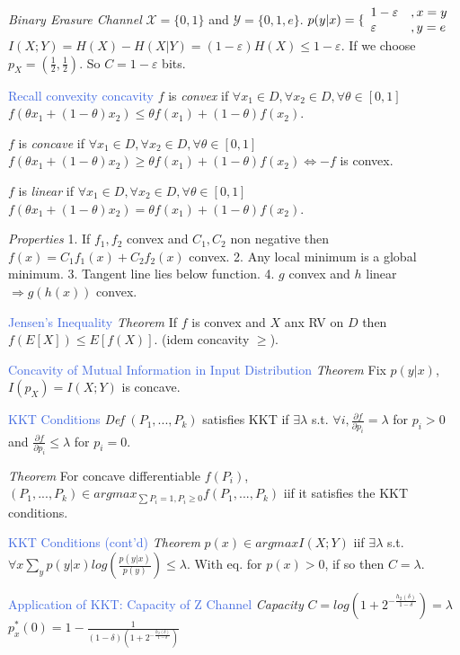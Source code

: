 \documentclass[10pt,a4paper,landscape]{article}
\newcommand{\concept}[1]{\textcolor{RoyalBlue}{#1}}
\newcommand{\subconcept}[1]{\textcolor{PineGreen}{\textit{#1}}}
\begin{document}
\begin{multicols*}{4}
\subconcept{Binary Erasure Channel}
$\mathcal{X}=\{0,1\}$ and $\mathcal{Y}=\{0,1,e\}$.
$p(y|x)=\{
   \begin{array}{l l}
      1-\varepsilon & ,x=y \\
      \varepsilon & ,y=e 
   \end{array}$
$I(X;Y)=H(X)-H(X|Y)=(1-\varepsilon)H(X) \le 1-\varepsilon$.
If we choose $p_X=(\frac{1}{2},\frac{1}{2})$.
So $C=1-\varepsilon$ bits.

\concept{Recall convexity concavity}
$f$ is \subconcept{convex} if $\forall x_1 \in D, \forall x_2 \in D, \forall \theta \in [0,1]$
$f(\theta x_1 + (1-\theta)x_2) \le \theta f(x_1)+ (1-\theta)f(x_2)$.

$f$ is \subconcept{concave} if $\forall x_1 \in D, \forall x_2 \in D, \forall \theta \in [0,1]$
$f(\theta x_1 + (1-\theta)x_2) \ge \theta f(x_1)+ (1-\theta)f(x_2) \Leftrightarrow -f$ is convex.

$f$ is \subconcept{linear} if $\forall x_1 \in D, \forall x_2 \in D, \forall \theta \in [0,1]$
$f(\theta x_1 + (1-\theta)x_2) = \theta f(x_1)+ (1-\theta)f(x_2)$.

\subconcept{Properties}
1. If $f_1,f_2$ convex and $C_1,C_2$ non negative then $f(x)=C_1f_1(x)+C_2f_2(x)$ convex.
2. Any local minimum is a global minimum.
3. Tangent line lies below function.
4. $g$ convex and $h$ linear $\Rightarrow g(h(x))$ convex.

\concept{Jensen's Inequality }
\subconcept{Theorem} If $f$ is convex and $X$ anx RV on $D$
then $f(E[X]) \le E[f(X)]$. (idem concavity $\ge$).

\concept{Concavity of Mutual Information in Input Distribution}
\subconcept{Theorem} Fix $p(y|x)$, $I(p_X)=I(X;Y)$ is concave.
 
\concept{KKT Conditions} 
\subconcept{Def} $(P_1,...,P_k)$ satisfies KKT if $\exists \lambda$ s.t.
$\forall i, \frac{\partial f}{\partial p_i} = \lambda$ for $p_i >0$ and
$\frac{\partial f}{\partial p_i} \le \lambda$ for $p_i=0$.

\subconcept{Theorem} For concave differentiable $f(P_i)$,
$(P_1,...,P_k) \in argmax_{\sum P_i = 1 , P_i \ge 0} f(P_1,...,P_k)$
iif it satisfies the KKT conditions.

\concept{KKT Conditions (cont'd)}
\subconcept{Theorem} $p(x) \in argmax I(X;Y)$ iif $\exists \lambda$ s.t. 
$\forall x \sum_y p(y|x) log (\frac{p(y|x)}{p(y)}) \le \lambda$.
With eq. for $p(x)>0$, if so then $C=\lambda$.

\concept{Application of KKT: Capacity of Z Channel} 
\subconcept{Capacity} $C=log(1+2^{-\frac{h_2(\delta)}{1-\delta}})=\lambda$
$p_x^*(0)=1-\frac{1}{(1-\delta)(1+2^{-\frac{h_2(\delta)}{1-\delta}})}$
 

\end{multicols*}
\end{document}
